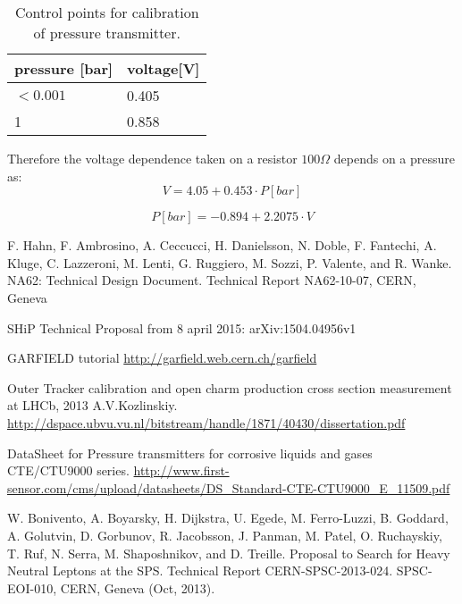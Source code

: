 \documentclass[12pt,a4paper]{article}
\begin{document}
	
	\begin{table}[!h]
	\centering
	\caption{ Control points for calibration of pressure transmitter.}
	\begin{tabular}{|l|l|}
		\hline
		pressure [bar] & voltage[V] \\
		\hline
		$<0.001$ & 0.405\\
		\hline
		1 & 0.858\\
		\hline
	\end{tabular}
	\end{table}
	
	Therefore the voltage dependence taken on a resistor 	$100\Omega$ depends on a pressure as:
	\begin{equation}
	V = 4.05 + 0.453 \cdot P[bar]
	\end{equation}

	\begin{equation}	
	P[bar] = -0.894 + 2.2075 \cdot V
	\end{equation}

\newpage
\begin{thebibliography}{00}	
		
	 F. Hahn, F. Ambrosino, A. Ceccucci, H. Danielsson, N. Doble, F. Fantechi, A. Kluge, C. Lazzeroni, M. Lenti, G. Ruggiero, M. Sozzi, P. Valente, and R. Wanke. NA62: Technical Design Document. Technical Report NA62-10-07, CERN, Geneva
	
	 SHiP Technical Proposal from 8 april 2015: arXiv:1504.04956v1
	
	 GARFIELD tutorial \url{http://garfield.web.cern.ch/garfield}
	
	 Outer Tracker calibration and open charm production cross section measurement at LHCb, 2013 A.V.Kozlinskiy. \\  \url{http://dspace.ubvu.vu.nl/bitstream/handle/1871/40430/dissertation.pdf}
	
	 DataSheet for Pressure transmitters for corrosive liquids and gases CTE/CTU9000 series. \url{http://www.first-sensor.com/cms/upload/datasheets/DS_Standard-CTE-CTU9000_E_11509.pdf}
	
	 W. Bonivento, A. Boyarsky, H. Dijkstra, U. Egede, M. Ferro-Luzzi, B. Goddard, A. Golutvin, D. Gorbunov, R. Jacobsson, J. Panman, M. Patel, O. Ruchayskiy, T. Ruf, N. Serra, M. Shaposhnikov, and D. Treille. Proposal to Search for Heavy Neutral Leptons at the SPS. Technical Report CERN-SPSC-2013-024. SPSC-EOI-010, CERN, Geneva (Oct, 2013).
	
\end{thebibliography}
	
\end{document}
